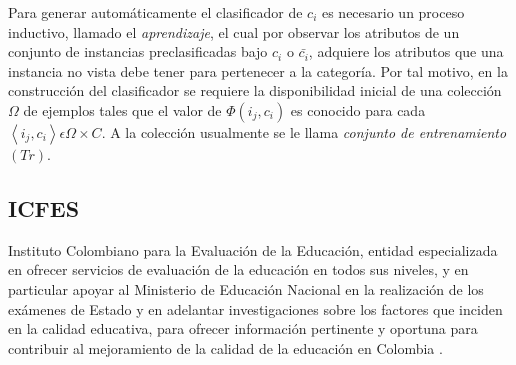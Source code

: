 Para generar automáticamente el clasificador de $c_{i}$ es necesario
un proceso inductivo, llamado el \emph{aprendizaje}, el cual por observar
los atributos de un conjunto de instancias preclasificadas bajo $c_{i}$
o $\bar{c_{i}}$, adquiere los atributos que una instancia no vista
debe tener para pertenecer a la categoría. Por tal motivo, en la construcción
del clasificador se requiere la disponibilidad inicial de una colección
$\Omega$ de ejemplos tales que el valor de $\Phi\left(i_{j},c_{i}\right)$
es conocido para cada $\left\langle i_{j},c_{i}\right\rangle \epsilon\Omega\times C$.
A la colección usualmente se le llama \emph{conjunto de entrenamiento}
$\left(Tr\right)$\cite{key-70}.
\subsection{ICFES}
Instituto Colombiano para la Evaluación de la Educación, entidad especializada en ofrecer servicios de evaluación de la educación en todos sus niveles, y en particular apoyar al Ministerio de Educación Nacional en la realización de los exámenes de Estado y en adelantar investigaciones sobre los factores que inciden en la calidad educativa, para ofrecer información pertinente y oportuna para contribuir al mejoramiento de la calidad de la educación en Colombia \cite{key-80}.

